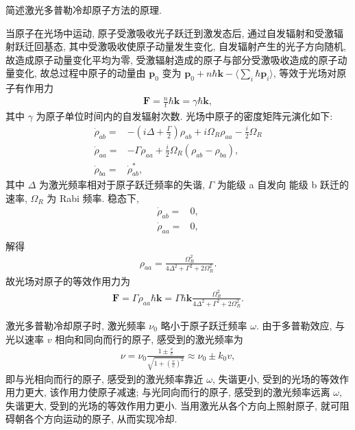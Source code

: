 \documentclass{assignment}
\begin{document}
\begin{prob}
    简述激光多普勒冷却原子方法的原理.
\end{prob}
\begin{sol}
    当原子在光场中运动, 原子受激吸收光子跃迁到激发态后, 通过自发辐射和受激辐射跃迁回基态, 其中受激吸收使原子动量发生变化, 自发辐射产生的光子方向随机, 故造成原子动量变化平均为零, 受激辐射造成的原子与部分受激吸收造成的原子动量变化, 故总过程中原子的动量由 $\bm{p}_0$ 变为 $\bm{p}_0+n\hbar\bm{k}-\langle\sum_i\hbar\bm{p}_i\rangle$, 等效于光场对原子有作用力
    \begin{align}
        \bm{F}=\frac{n}{t}\hbar\bm{k}=\gamma\hbar\bm{k},
    \end{align}
    其中 $\gamma$ 为原子单位时间内的自发辐射次数.
    光场中原子的密度矩阵元演化如下:
    \begin{align}
        \dot{\rho}_{ab}=&-\left(i\Delta+\frac{\Gamma}{2}\right)\rho_{ab}+i\Omega_R\rho_{aa}-\frac{i}{2}\Omega_R\\
        \dot{\rho}_{aa}=&-\Gamma\rho_{aa}+\frac{i}{2}\Omega_R(\rho_{ab}-\rho_{ba}),\\
        \dot{\rho}_{ba}=&\dot{\rho}_{ab}^*,
    \end{align}
    其中 $\Delta$ 为激光频率相对于原子跃迁频率的失谐, $\Gamma$ 为能级 a 自发向 能级 b 跃迁的速率, $\Omega_R$ 为 Rabi 频率.
    稳态下,
    \begin{align}
        \dot{\rho}_{ab}=&0,\\
        \dot{\rho}_{aa}=&0,\\
    \end{align}
    解得
    \begin{align}
        \rho_{aa}=\frac{\Omega_R^2}{4\Delta^2+\Gamma^2+2\Omega_R^2}.
    \end{align}
    故光场对原子的等效作用力为
    \begin{align}
        \bm{F}=\Gamma\rho_{aa}\hbar\bm{k}=\Gamma\hbar\bm{k}\frac{\Omega_R^2}{4\Delta^2+\Gamma^2+2\Omega_R^2}.
    \end{align}

    激光多普勒冷却原子时, 激光频率 $\nu_0$ 略小于原子跃迁频率 $\omega$. 由于多普勒效应, 与光以速率 $v$ 相向和同向而行的原子, 感受到的激光频率为
    \begin{align}
        \nu=\nu_0\frac{1\pm\frac{v}{c}}{\sqrt{1+\left(\frac{v}{c}\right)^2}}\approx\nu_0\pm k_0v,
    \end{align}
    即与光相向而行的原子, 感受到的激光频率靠近 $\omega$, 失谐更小, 受到的光场的等效作用力更大, 该作用力使原子减速; 与光同向而行的原子, 感受到的激光频率远离 $\omega$, 失谐更大, 受到的光场的等效作用力更小.
    当用激光从各个方向上照射原子, 就可阻碍朝各个方向运动的原子, 从而实现冷却.
\end{sol}
\end{document}
